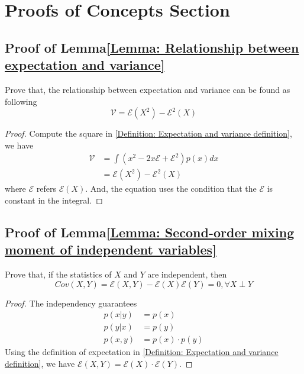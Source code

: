 \documentclass[../main.tex]{subfiles}
\begin{document}
\section{Proofs of Concepts Section}

\subsection{Proof of Lemma\ref{Lemma: Relationship between expectation and variance}}
Prove that, the relationship between expectation and variance can be found as following
\begin{equation*}
    \mathcal{V} = \mathcal{E}(X^2) - \mathcal{E}^2(X)
\end{equation*}

\begin{proof}
    Compute the square in \eqref{Definition: Expectation and variance definition},
    we have
    \begin{align*}
        \mathcal{V} & = \int (x^2 - 2 x \mathcal{E} + \mathcal{E}^2) p(x) dx \\
                    & = \mathcal{E}(X^2) - \mathcal{E}^2(X)
    \end{align*}
    where $\mathcal{E}$ refers $\mathcal{E}(X)$.
    And, the equation uses the condition that the $\mathcal{E}$ is constant in the integral.
\end{proof}


\subsection{Proof of Lemma\ref{Lemma: Second-order mixing moment of independent variables}}
Prove that, if the statistics of $X$ and $Y$ are independent, then
\begin{equation*}
    Cov(X, Y) =
    \mathcal{E}(X, Y) - \mathcal{E}(X) \mathcal{E}(Y) = 0,
    \forall X \perp Y
\end{equation*}

\begin{proof}
    The independency guarantees
    \begin{align*}
        p(x|y)  & = p(x)            \\
        p(y|x)  & = p(y)            \\
        p(x, y) & = p(x) \cdot p(y)
    \end{align*}
    Using the definition of expectation in \eqref{Definition: Expectation and variance definition},
    we have $\mathcal{E}(X, Y) = \mathcal{E}(X) \cdot \mathcal{E}(Y)$.
\end{proof}
\end{document}
